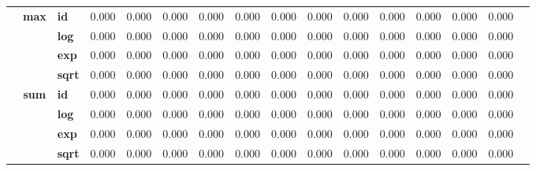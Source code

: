 \begin{table}[t]
{\begin{tabular}{cclccccccccccccc}
        \cmidrule{2-15}
            & \multirow{4}{*}{\textbf{max}} 
              & \textbf{id}   & 0.000 & 0.000 & 0.000 & 0.000 & 0.000 & 0.000 & 0.000 & 0.000 & 0.000 & 0.000 & 0.000 & 0.000 \\
            & & \textbf{log}  & 0.000 & 0.000 & 0.000 & 0.000 & 0.000 & 0.000 & 0.000 & 0.000 & 0.000 & 0.000 & 0.000 & 0.000 \\
            & & \textbf{exp}  & 0.000 & 0.000 & 0.000 & 0.000 & 0.000 & 0.000 & 0.000 & 0.000 & 0.000 & 0.000 & 0.000 & 0.000 \\
            & & \textbf{sqrt} & 0.000 & 0.000 & 0.000 & 0.000 & 0.000 & 0.000 & 0.000 & 0.000 & 0.000 & 0.000 & 0.000 & 0.000 \\
        \cmidrule{2-15}
            & \multirow{4}{*}{\textbf{sum}} 
              & \textbf{id}   & 0.000 & 0.000 & 0.000 & 0.000 & 0.000 & 0.000 & 0.000 & 0.000 & 0.000 & 0.000 & 0.000 & 0.000 \\
            & & \textbf{log}  & 0.000 & 0.000 & 0.000 & 0.000 & 0.000 & 0.000 & 0.000 & 0.000 & 0.000 & 0.000 & 0.000 & 0.000 \\
            & & \textbf{exp}  & 0.000 & 0.000 & 0.000 & 0.000 & 0.000 & 0.000 & 0.000 & 0.000 & 0.000 & 0.000 & 0.000 & 0.000 \\
            & & \textbf{sqrt} & 0.000 & 0.000 & 0.000 & 0.000 & 0.000 & 0.000 & 0.000 & 0.000 & 0.000 & 0.000 & 0.000 & 0.000 \\
        \midrule


\end{tabular}}
\end{table}
